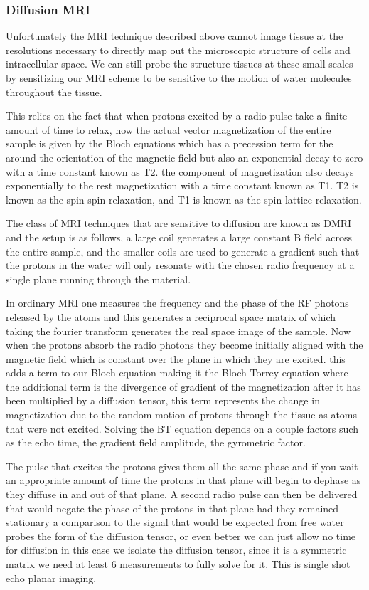 \subsubsection{Diffusion MRI}

Unfortunately the MRI technique described above cannot image tissue at the resolutions necessary to directly map out the microscopic structure of cells and intracellular space. We can still probe the structure tissues at these small scales by sensitizing our MRI scheme to be sensitive to the motion of water molecules throughout the tissue.

This relies on the fact that when protons excited by a radio pulse take a finite amount of time to relax, now the actual vector magnetization of the entire sample is given by the Bloch equations which has a precession term for the around the orientation of the magnetic field but also an exponential decay to zero with a time constant known as T2. the component of magnetization also decays exponentially to the rest magnetization with a time constant known as T1. T2 is known as the spin spin relaxation, and T1 is known as the spin lattice relaxation.

The class of MRI techniques that are sensitive to diffusion are known as DMRI and the setup is as follows, a large coil generates a large constant B field across the entire sample, and the smaller coils are used to generate a gradient such that the protons in the water will only resonate with the chosen radio frequency at a single plane running through the material.

In ordinary MRI one  measures the frequency and the phase of the RF photons released by the atoms and this generates a reciprocal space matrix of which taking the fourier transform generates the real space image of the sample. Now when the protons absorb the radio photons they become initially aligned with the magnetic field which is constant over the plane in which they are excited. this adds a term to our Bloch equation making it the Bloch Torrey equation where the additional term is the divergence of gradient of the magnetization after it has been multiplied by a diffusion tensor, this term represents the change in magnetization due to the random motion of protons through the tissue as atoms that were not excited. Solving the BT equation depends on a couple factors such as the echo time, the gradient field amplitude, the gyrometric factor.

The pulse that excites the protons gives them all the same phase and if you wait an appropriate amount of time the protons in that plane will begin to dephase as they diffuse in and out of that plane. A second radio pulse can then be delivered that would negate the phase of the protons in that plane had they remained stationary a comparison to the signal that would be expected from free water probes the form of the diffusion tensor, or even better we can just allow no time for diffusion in this case we isolate the diffusion tensor, since it is a symmetric matrix we need at least 6 measurements to fully solve for it. This is single shot echo planar imaging.

